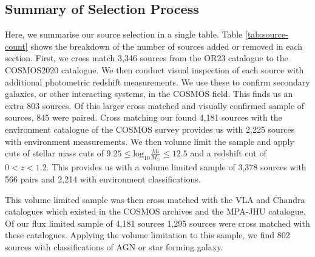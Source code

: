 \subsection{Summary of Selection Process}
Here, we summarise our source selection in a single table. Table \ref{tab:source-count} shows the breakdown of the number of sources added or removed in each section. First, we cross match 3,346 sources from the OR23 catalogue to the COSMOS2020 catalogue. We then conduct visual inspection of each source with additional photometric redshift measurements. We use these to confirm secondary galaxies, or other interacting systems, in the COSMOS field. This finds us an extra 803 sources. Of this larger cross matched and visually confirmed sample of sources, 845 were paired. Cross matching our found 4,181 sources with the \citet{2017ApJ...837...16D} environment catalogue of the COSMOS survey provides us with 2,225 sources with environment measurements. We then volume limit the sample and apply cuts of stellar mass cuts of $9.25 \leq \textrm{log}_{10} \frac{M_{*}}{M_{\odot}} \leq 12.5$ and a redshift cut of $0 < z < 1.2$. This provides us with a volume limited sample of 3,378 sources with 566 pairs and 2,214 with environment classifications.

This volume limited sample was then cross matched with the VLA and Chandra catalogues which existed in the COSMOS archives and the MPA-JHU catalogue. Of our flux limited sample of 4,181 sources 1,295 sources were cross matched with these catalogues. Applying the volume limitation to this sample, we find 802 sources with classifications of AGN or star forming galaxy.


\begin{table}
\centering
{}
\caption[Source counts at each stage of our selection process.]{Source counts at each stage of our selection process. This is Table details the selection for each of our samples: interacting galaxies, with density measurements, containing an AGN.}
\label{tab:source-count}
\end{table}

